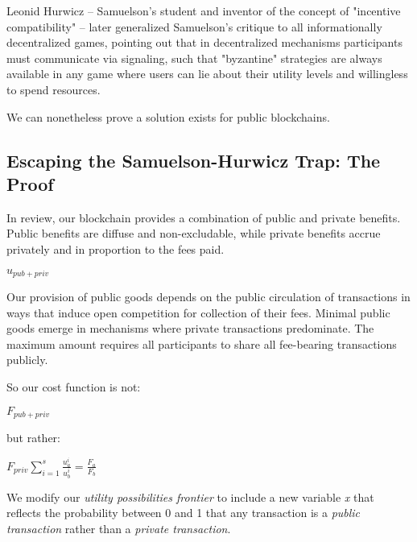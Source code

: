 \documentclass[oneside]{article}   	%
\begin{document}
Leonid Hurwicz -- Samuelson's student and inventor of the concept of "incentive compatibility" -- later generalized Samuelson's critique to all informationally decentralized games, pointing out that in decentralized mechanisms participants must communicate via signaling, such that "byzantine" strategies are always available in any game where users can lie about their utility levels and willingless to spend resources.

We can nonetheless prove a solution exists for public blockchains.

\subsection*{Escaping the Samuelson-Hurwicz Trap: The Proof}

In review, our blockchain provides a combination of public and private benefits. Public benefits are diffuse and non-excludable, while private benefits accrue privately and in proportion to the fees paid.

\large
\begin{adjustwidth}{1.5em}{1.5em} 
\begin{math}
{u_{{pub}+{priv}}}
\end{math}
\end{adjustwidth}
\normalsize

Our provision of public goods depends on the public circulation of transactions in ways that induce open competition for collection of their fees. Minimal public goods emerge in mechanisms where private transactions predominate. The maximum amount requires all participants to share all fee-bearing transactions publicly.

So our cost function is not:

\large
\begin{adjustwidth}{1.5em}{1.5em} 
\begin{math}
{F_{{pub}+{priv}}}
\end{math}
\end{adjustwidth}
\normalsize

but rather:

\large
\begin{adjustwidth}{1.5em}{1.5em} 
\begin{math}
{F_{{priv}}}
\sum_{i=1}^{s} \frac{u_a^i}{u_b^i} = \frac{F_a}{F_b}
\end{math}
\end{adjustwidth}
\normalsize

We modify our \textit{utility possibilities frontier} to include a new variable \textit{x} that reflects the probability between 0 and 1 that any transaction is a \textit{public transaction} rather than a \textit{private transaction}.
\end{document}
